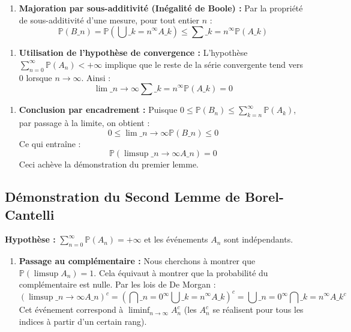 \documentclass[11pt,a4paper]{article}
\begin{document}
\begin{enumerate}
\item \textbf{Majoration par sous-additivité (Inégalité de Boole) :}
   Par la propriété de sous-additivité d'une mesure, pour tout entier $n$ :
   $$ \mathbb{P}(B\_n) = \mathbb{P}\left( \bigcup\_{k=n}^\infty A\_k \right) \le \sum\_{k=n}^\infty \mathbb{P}(A\_k) $$
\end{enumerate}

\begin{enumerate}
\item \textbf{Utilisation de l'hypothèse de convergence :}
   L'hypothèse $\sum_{n=0}^\infty \mathbb{P}(A_n) < +\infty$ implique que le reste de la série convergente tend vers $0$ lorsque $n \to \infty$. Ainsi :
   $$ \lim\_{n \to \infty} \sum\_{k=n}^\infty \mathbb{P}(A\_k) = 0 $$
\end{enumerate}

\begin{enumerate}
\item \textbf{Conclusion par encadrement :}
   Puisque $0 \le \mathbb{P}(B_n) \le \sum_{k=n}^\infty \mathbb{P}(A_k)$, par passage à la limite, on obtient :
   $$ 0 \le \lim\_{n \to \infty} \mathbb{P}(B\_n) \le 0 $$
   Ce qui entraîne :
   $$ \mathbb{P}\left(\limsup\_{n \to \infty} A\_n\right) = 0 $$
   Ceci achève la démonstration du premier lemme.
\end{enumerate}


\subsection{Démonstration du Second Lemme de Borel-Cantelli}

\textbf{Hypothèse :} $\sum_{n=0}^\infty \mathbb{P}(A_n) = +\infty$ et les événements $A_n$ sont indépendants.

\begin{enumerate}
\item \textbf{Passage au complémentaire :}
   Nous cherchons à montrer que $\mathbb{P}(\limsup A_n) = 1$. Cela équivaut à montrer que la probabilité du complémentaire est nulle.
   Par les lois de De Morgan :
   $$ \left( \limsup\_{n \to \infty} A\_n \right)^c = \left( \bigcap\_{n=0}^\infty \bigcup\_{k=n}^\infty A\_k \right)^c = \bigcup\_{n=0}^\infty \bigcap\_{k=n}^\infty A\_k^c $$
   Cet événement correspond à $\liminf_{n \to \infty} A_n^c$ (les $A_n^c$ se réalisent pour tous les indices à partir d'un certain rang).
\end{enumerate}
\end{document}
